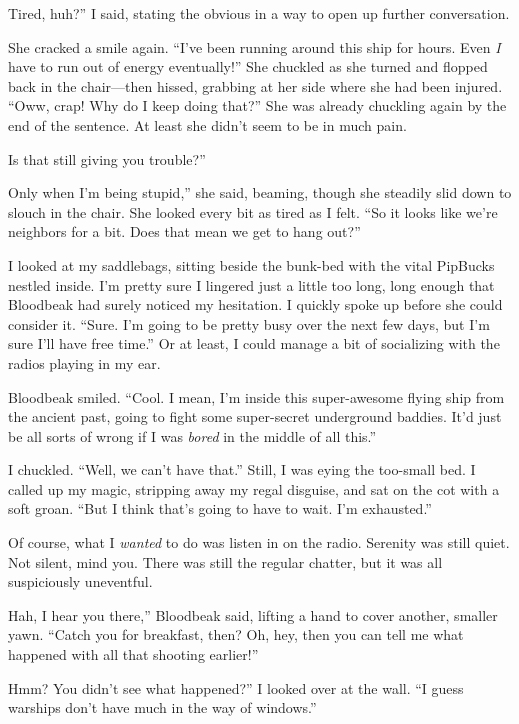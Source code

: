 \leavevmode{}Tired, huh?” I said, stating the obvious in a way to open up further conversation.

She cracked a smile again. “I’ve been running around this ship for hours. Even \textit{I} have to run out of energy eventually!” She chuckled as she turned and flopped back in the chair—then hissed, grabbing at her side where she had been injured. “Oww, crap! Why do I keep doing that?” She was already chuckling again by the end of the sentence. At least she didn’t seem to be in much pain.

\leavevmode{}Is that still giving you trouble?”

\leavevmode{}Only when I’m being stupid,” she said, beaming, though she steadily slid down to slouch in the chair. She looked every bit as tired as I felt. “So it looks like we’re neighbors for a bit. Does that mean we get to hang out?”

I looked at my saddlebags, sitting beside the bunk-bed with the vital PipBucks nestled inside. I’m pretty sure I lingered just a little too long, long enough that Bloodbeak had surely noticed my hesitation. I quickly spoke up before she could consider it. “Sure. I’m going to be pretty busy over the next few days, but I’m sure I’ll have free time.” Or at least, I could manage a bit of socializing with the radios playing in my ear.

Bloodbeak smiled. “Cool. I mean, I’m inside this super-awesome flying ship from the ancient past, going to fight some super-secret underground baddies. It’d just be all sorts of wrong if I was \textit{bored} in the middle of all this.”

I chuckled. “Well, we can’t have that.” Still, I was eying the too-small bed. I called up my magic, stripping away my regal disguise, and sat on the cot with a soft groan. “But I think that’s going to have to wait. I’m exhausted.”

Of course, what I \textit{wanted} to do was listen in on the radio. Serenity was still quiet. Not silent, mind you. There was still the regular chatter, but it was all suspiciously uneventful.

\leavevmode{}Hah, I hear you there,” Bloodbeak said, lifting a hand to cover another, smaller yawn. “Catch you for breakfast, then? Oh, hey, then you can tell me what happened with all that shooting earlier!”

\leavevmode{}Hmm? You didn’t see what happened?” I looked over at the wall. “I guess warships don’t have much in the way of windows.”

